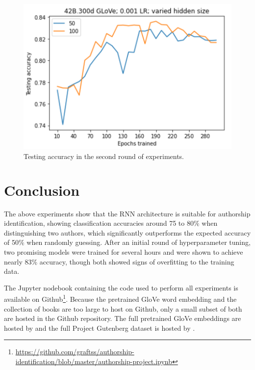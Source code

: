 \documentclass[12pt,letterpaper]{article}
\begin{document}
\begin{figure}
    \centering
    \includegraphics{exp-round-2-.png}
    \caption{Testing accuracy in the second round of experiments.}
    \label{fig:acc-round-2}
\end{figure}

\section{Conclusion}

The above experiments show that the RNN architecture is suitable for authorship identification, showing classification accuracies around 75 to 80\% when distinguishing two authors, which significantly outperforms the expected accuracy of 50\% when randomly guessing. After an initial round of hyperparameter tuning, two promising models were trained for several hours and were shown to achieve nearly 83\% accuracy, though both showed signs of overfitting to the training data. 

The Jupyter nodebook containing the code used to perform all experiments is available on Github\footnote{\url{https://github.com/graftss/authorship-identification/blob/master/authorship-project.ipynb}}. Because the pretrained GloVe word embedding and the collection of books are too large to host on Github, only a small subset of both are hosted in the Github repository. The full pretrained GloVe embeddings are hosted by \cite{glovesite} and the full Project Gutenberg dataset is hosted by \cite{pgdataset}.


\nocite{*}
\printbibliography
\end{document}
